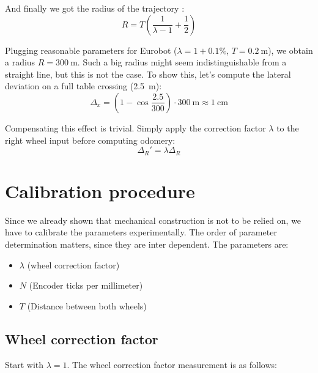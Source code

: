\documentclass[a4paper]{IEEEtran}
\begin{document}
And finally we got the radius of the trajectory :
\begin{equation*}
    R = T \left(\frac{1}{\lambda - 1}  + \frac{1}{2}\right)
\end{equation*}

Plugging reasonable parameters for Eurobot ($\lambda=1+0.1\%$, $T = \SI{0.2}{\meter}$), we obtain a radius $R = \SI{300}{\meter}$. 
Such a big radius might seem indistinguishable from a straight line, but this is not the case.
To show this, let's compute the lateral deviation on a full table crossing (\SI{2.5}{\meter}):
\begin{equation*}
    \Delta_x = \left( 1 - \cos \frac{2.5}{300} \right) \cdot \SI{300}{\meter} \approx \SI{1}{\centi\meter}
\end{equation*}


Compensating this effect is trivial.
Simply apply the correction factor $\lambda$ to the right wheel input before computing odomery:
\begin{equation}
    \Delta_R' = \lambda \Delta_R
\end{equation}

\section{Calibration procedure}
Since we already shown that mechanical construction is not to be relied on, we have to calibrate the parameters experimentally.
The order of parameter determination matters, since they are inter dependent.
The parameters are:
\begin{itemize}
    \item $\lambda$ (wheel correction factor)
    \item $N$ (Encoder ticks per millimeter)
    \item $T$ (Distance between both wheels)
\end{itemize}

\subsection{Wheel correction factor}
Start with $\lambda=1$.
The wheel correction factor measurement is as follows:
\end{document}
